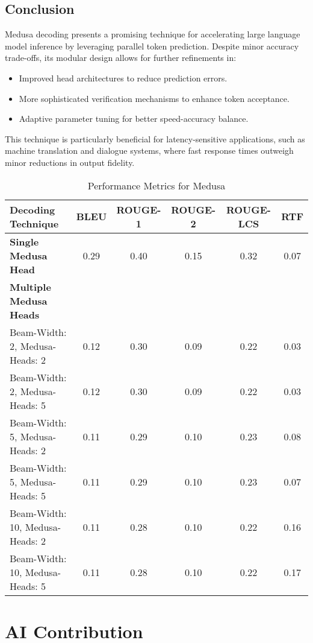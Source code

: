 \documentclass{article}
\begin{document}
\subsection{Conclusion}
Medusa decoding presents a promising technique for accelerating large language model inference by leveraging parallel token prediction. Despite minor accuracy trade-offs, its modular design allows for further refinements in:
\begin{itemize}
    \item Improved head architectures to reduce prediction errors.
    \item More sophisticated verification mechanisms to enhance token acceptance.
    \item Adaptive parameter tuning for better speed-accuracy balance.
\end{itemize}
This technique is particularly beneficial for latency-sensitive applications, such as machine translation and dialogue systems, where fast response times outweigh minor reductions in output fidelity.


\begin{table}[h!]
\begin{center}
\begin{tabular}{|l||c c c c c||} 
\hline
Decoding Technique & BLEU & ROUGE-1 & ROUGE-2 & ROUGE-LCS & RTF\\ [0.5ex] 
\hline\hline
\textbf{Single Medusa Head}  & 0.29 & 0.40 & 0.15 & 0.32 & 0.07 \\ 
\hline 
\textbf{Multiple Medusa Heads} & & & & & \\ 
Beam-Width: 2, Medusa-Heads: 2 & 0.12 & 0.30 & 0.09 & 0.22 & 0.03 \\ 
Beam-Width: 2, Medusa-Heads: 5 & 0.12 & 0.30 & 0.09 & 0.22 & 0.03 \\ 
Beam-Width: 5, Medusa-Heads: 2 & 0.11 & 0.29 & 0.10 & 0.23 & 0.08 \\ 
Beam-Width: 5, Medusa-Heads: 5 & 0.11 & 0.29 & 0.10 & 0.23 & 0.07 \\ 
Beam-Width: 10, Medusa-Heads: 2 & 0.11 & 0.28 & 0.10 & 0.22 & 0.16 \\ 
Beam-Width: 10, Medusa-Heads: 5 & 0.11 & 0.28 & 0.10 & 0.22 & 0.17 \\ 
\hline 
\end{tabular}
\end{center}
\caption{Performance Metrics for Medusa}
\end{table}

\newpageZ
\section{AI Contribution}
\label{sec:ai_contribution}
\end{document}
